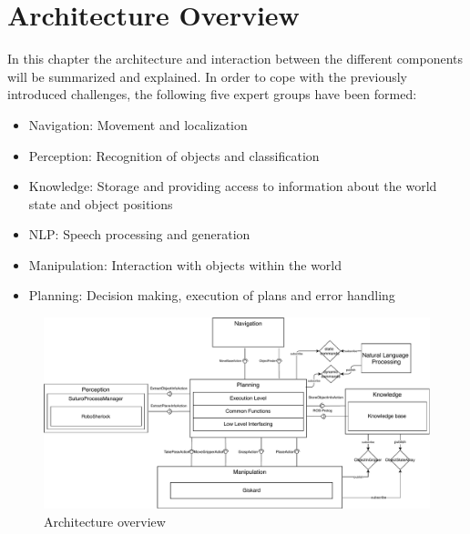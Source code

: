 \documentclass[main.tex]{subfiles}
\begin{document}
	\begingroup

	\renewcommand{\cleardoublepage}{}

	\renewcommand{\clearpage}{}
	
	\newpage

	\chapter{Architecture Overview}
		In this chapter the architecture and interaction between the different components will be summarized and explained.
		In order to cope with the previously introduced challenges, the following five expert groups have been formed:

		\begin{itemize}
			\item Navigation: Movement and localization
			\item Perception: Recognition of objects and classification
			\item Knowledge: Storage and providing access to information about the world state and object positions
			\item NLP: Speech processing and generation
			\item Manipulation: Interaction with objects within the world
			\item Planning: Decision making, execution of plans and error handling
		\end{itemize}
		
			\begin{rotatepage}
				\begin{figure}[H]
					\centering
					\includegraphics[width=1.5\linewidth, angle=90]{pictures/diagramms/overview}
					\caption{Architecture overview}
					\label{architecture}
				\end{figure}
			\end{rotatepage}
		
\end{document}
